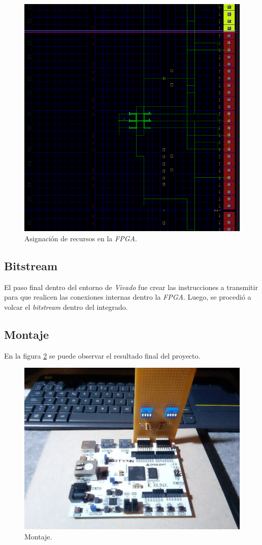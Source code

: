 \documentclass[
    11pt,
    spanish,
	a4paper
]{article}
\begin{document}
\begin{figure}
    \centering
    \includegraphics[width=\textwidth]{img/imp_device.png}
    \caption{Asignación de recursos en la \emph{FPGA}.}
    \label{fig:imp_device}
\end{figure}

\subsection{Bitstream}
\label{subsec:bitstream}

El paso final dentro del entorno de \emph{Vivado} fue crear las instrucciones a transmitir para que realicen las conexiones internas dentro la \emph{FPGA}.
Luego, se procedió a volcar el \emph{bitstream} dentro del integrado.

\subsection{Montaje}
\label{subsec:montaje}

En la figura \ref{fig:montaje} se puede observar el resultado final del proyecto.

\begin{figure}
    \centering
    \includegraphics[width=\textwidth]{img/montaje.jpeg}
    \caption{Montaje.}
    \label{fig:montaje}
\end{figure}
\end{document}
